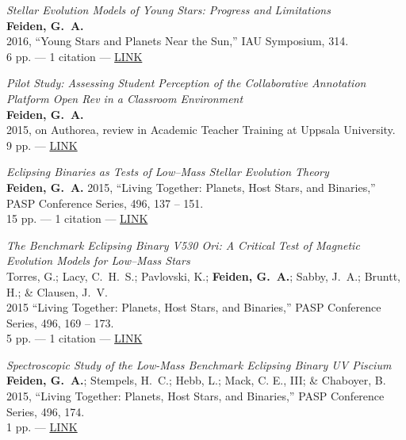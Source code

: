 \documentclass[11pt,a4paper]{article}
\begin{document}
\begin{etaremune}[leftmargin=0.30in]
	\item \emph{Stellar Evolution Models of Young Stars: Progress and Limitations} \\
	{\bf Feiden, G.~A.} \\
	2016, ``Young Stars and Planets Near the Sun,'' IAU Symposium, 314. \\
	6 pp. --- 1 citation --- \href{http://adsabs.harvard.edu/abs/2015IAUS..314...79F}{LINK}

	\item \emph{Pilot Study: Assessing Student Perception of the Collaborative Annotation Platform
	{\rm Open Rev} in a Classroom Environment} \\
	{\bf Feiden, G.~A.} \\
	2015, on Authorea, review in Academic Teacher Training at Uppsala University. \\
	9 pp. --- \href{https://www.authorea.com/users/18170/articles/20333/}{LINK}

	\item \emph{Eclipsing Binaries as Tests of Low--Mass Stellar Evolution Theory} \\
	{\bf Feiden, G.~A.} 
	2015, ``Living Together: Planets, Host Stars, and Binaries,'' PASP Conference Series, 496, 137 -- 151. \\
	15 pp. --- 1 citation --- \href{http://adsabs.harvard.edu/abs/2015ASPC..496..137F}{LINK}
	
	\item \emph{The Benchmark Eclipsing Binary V530 Ori: A Critical Test of Magnetic Evolution 
	            Models for Low--Mass Stars} \\
	Torres, G.; Lacy, C.~H.~S.; Pavlovski, K.; {\bf Feiden, G.~A.}; Sabby, J.~A.; Bruntt, H.; \& Clausen, J.~V. \\
	2015 ``Living Together: Planets, Host Stars, and Binaries,'' PASP Conference Series, 496, 169 -- 173. \\
	5 pp. --- 1 citation --- \href{http://adsabs.harvard.edu/abs/2015ASPC..496..169T}{LINK}
	
	\item \emph{Spectroscopic Study of the Low-Mass Benchmark Eclipsing Binary UV Piscium} \\
	{\bf Feiden, G.~A.}; Stempels, H.~C.; Hebb, L.; Mack, C. E., III; \& Chaboyer, B. \\
	2015, ``Living Together: Planets, Host Stars, and Binaries,'' PASP Conference Series, 496, 174. \\
	1 pp. --- \href{http://adsabs.harvard.edu/abs/2015ASPC..496..174F}{LINK}
	

\end{etaremune}
\end{document}
